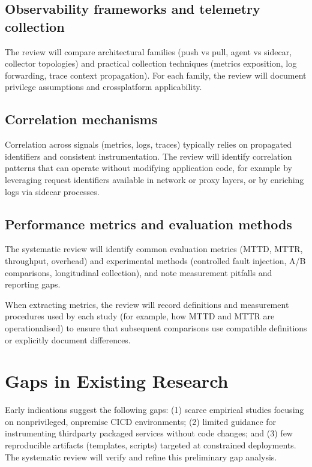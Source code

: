 \subsection{Observability frameworks and telemetry collection}
The review will compare architectural families (push vs pull, agent vs sidecar, collector topologies) and practical collection techniques (metrics exposition, log forwarding, trace context propagation). For each family, the review will document privilege assumptions and cross\-platform applicability.

\subsection{Correlation mechanisms}
Correlation across signals (metrics, logs, traces) typically relies on propagated identifiers and consistent instrumentation. The review will identify correlation patterns that can operate without modifying application code, for example by leveraging request identifiers available in network or proxy layers, or by enriching logs via sidecar processes.

\subsection{Performance metrics and evaluation methods}
The systematic review will identify common evaluation metrics (\ac{MTTD}, \ac{MTTR}, throughput, overhead) and experimental methods (controlled fault injection, A/B comparisons, longitudinal collection), and note measurement pitfalls and reporting gaps.

When extracting metrics, the review will record definitions and measurement procedures used by each study (for example, how \ac{MTTD} and \ac{MTTR} are operationalised) to ensure that subsequent comparisons use compatible definitions or explicitly document differences.

\section{Gaps in Existing Research}
Early indications suggest the following gaps: (1) scarce empirical studies focusing on non\-privileged, on\-premise \ac{CICD} environments; (2) limited guidance for instrumenting third\-party packaged services without code changes; and (3) few reproducible artifacts (templates, scripts) targeted at constrained deployments. The systematic review will verify and refine this preliminary gap analysis.


